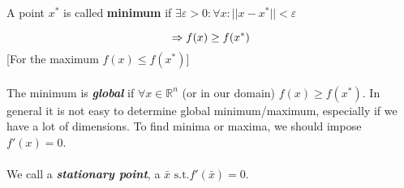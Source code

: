 A point $x^*$ is called \textbf{minimum} if
$\exists \varepsilon > 0 : \forall x : || x- x^* || < \varepsilon$

$$
\Rightarrow f(x) \geq f(x^*) \\
$$
\noindent
{[}For the maximum $f(x) \leq f(x^*)${]}
\\
\\
\noindent
The minimum is \textbf{\emph{global}} if $\forall x \in \mathbb{R}^n$
(or in our domain) $f(x) \geq f(x^*)$. In general it is not easy to
determine global minimum/maximum, especially if we have a lot of
dimensions.
\noindent
To find minima or maxima, we should impose $f'(x)=0$.
\\
\\
\noindent
We call a \textbf{\emph{stationary point}}, a
$\bar{x} \text{ s.t.} f'(\bar{x})=0$.
